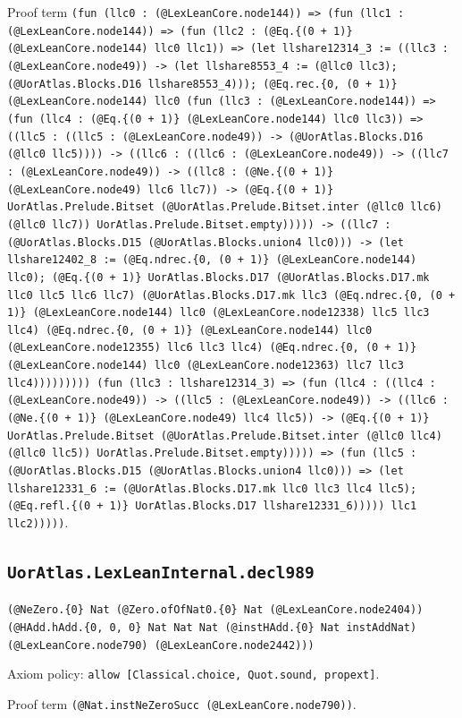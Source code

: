 \documentclass[11pt]{article}
\begin{document}
\noindent Proof term \texttt{(fun (llc0 : (@LexLeanCore.node144)) => (fun (llc1 : (@LexLeanCore.node144)) => (fun (llc2 : (@Eq.\{(0 + 1)\} (@LexLeanCore.node144) llc0 llc1)) => (let llshare12314\_3 := ((llc3 : (@LexLeanCore.node49)) -> (let llshare8553\_4 := (@llc0 llc3); (@UorAtlas.Blocks.D16 llshare8553\_4))); (@Eq.rec.\{0, (0 + 1)\} (@LexLeanCore.node144) llc0 (fun (llc3 : (@LexLeanCore.node144)) => (fun (llc4 : (@Eq.\{(0 + 1)\} (@LexLeanCore.node144) llc0 llc3)) => ((llc5 : ((llc5 : (@LexLeanCore.node49)) -> (@UorAtlas.Blocks.D16 (@llc0 llc5)))) -> ((llc6 : ((llc6 : (@LexLeanCore.node49)) -> ((llc7 : (@LexLeanCore.node49)) -> ((llc8 : (@Ne.\{(0 + 1)\} (@LexLeanCore.node49) llc6 llc7)) -> (@Eq.\{(0 + 1)\} UorAtlas.Prelude.Bitset (@UorAtlas.Prelude.Bitset.inter (@llc0 llc6) (@llc0 llc7)) UorAtlas.Prelude.Bitset.empty))))) -> ((llc7 : (@UorAtlas.Blocks.D15 (@UorAtlas.Blocks.union4 llc0))) -> (let llshare12402\_8 := (@Eq.ndrec.\{0, (0 + 1)\} (@LexLeanCore.node144) llc0); (@Eq.\{(0 + 1)\} UorAtlas.Blocks.D17 (@UorAtlas.Blocks.D17.mk llc0 llc5 llc6 llc7) (@UorAtlas.Blocks.D17.mk llc3 (@Eq.ndrec.\{0, (0 + 1)\} (@LexLeanCore.node144) llc0 (@LexLeanCore.node12338) llc5 llc3 llc4) (@Eq.ndrec.\{0, (0 + 1)\} (@LexLeanCore.node144) llc0 (@LexLeanCore.node12355) llc6 llc3 llc4) (@Eq.ndrec.\{0, (0 + 1)\} (@LexLeanCore.node144) llc0 (@LexLeanCore.node12363) llc7 llc3 llc4))))))))) (fun (llc3 : llshare12314\_3) => (fun (llc4 : ((llc4 : (@LexLeanCore.node49)) -> ((llc5 : (@LexLeanCore.node49)) -> ((llc6 : (@Ne.\{(0 + 1)\} (@LexLeanCore.node49) llc4 llc5)) -> (@Eq.\{(0 + 1)\} UorAtlas.Prelude.Bitset (@UorAtlas.Prelude.Bitset.inter (@llc0 llc4) (@llc0 llc5)) UorAtlas.Prelude.Bitset.empty))))) => (fun (llc5 : (@UorAtlas.Blocks.D15 (@UorAtlas.Blocks.union4 llc0))) => (let llshare12331\_6 := (@UorAtlas.Blocks.D17.mk llc0 llc3 llc4 llc5); (@Eq.refl.\{(0 + 1)\} UorAtlas.Blocks.D17 llshare12331\_6))))) llc1 llc2)))))}.\par
\subsection*{\texttt{UorAtlas.LexLeanInternal.decl989}}
\noindent\texttt{(@NeZero.\{0\} Nat (@Zero.ofOfNat0.\{0\} Nat (@LexLeanCore.node2404)) (@HAdd.hAdd.\{0, 0, 0\} Nat Nat Nat (@instHAdd.\{0\} Nat instAddNat) (@LexLeanCore.node790) (@LexLeanCore.node2442)))}\par
\noindent Axiom policy: \texttt{allow [Classical.choice, Quot.sound, propext]}.\par
\noindent Proof term \texttt{(@Nat.instNeZeroSucc (@LexLeanCore.node790))}.\par
\end{document}
